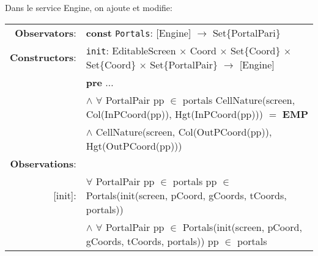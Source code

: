 \documentclass[8pt]{article}
\begin{document}
Dans le service \textrm{Engine}, on ajoute et modifie:

{\small
  \begin{longtable}{rl}
    \textbf{Observators}: & \textbf{const} \texttt{Portals}: \textrm{[Engine]} $\rightarrow$ \textrm{Set\{PortalPari\}} \\
    \textbf{Constructors}: &\texttt{init}: \textrm{EditableScreen} $\times$ \textrm{Coord} $\times$ \textrm{Set\{Coord\}} $\times$ \textrm{Set\{Coord\}} $\times$ \textrm{Set\{PortalPair\}} $\rightarrow$ \textrm{[Engine]} \\
      & \quad \textbf{pre} $\ldots$\\
      & \quad\quad\quad $\land$ $\forall$ \textrm{PortalPair} pp $\in$ \textrm{portals} \textrm{CellNature(screen, Col(InPCoord(pp)), Hgt(InPCoord(pp)))} $=$ \textbf{EMP}\\
    & \quad\quad\quad\quad\quad $\land$ \textrm{CellNature(screen, Col(OutPCoord(pp)), Hgt(OutPCoord(pp)))}\\
    \textbf{Observations}: &\\
    \textrm{[init]}: & $\forall$ \textrm{PortalPair} pp $\in$ \textrm{portals} pp $\in$ \textrm{Portals(init(screen, pCoord, gCoords, tCoords, portals))}\\
    & $\land$ $\forall$ \textrm{PortalPair} pp $\in$ \textrm{Portals(init(screen, pCoord, gCoords, tCoords, portals))} pp $\in$ portals\\
  \end{longtable}}
\end{document}
